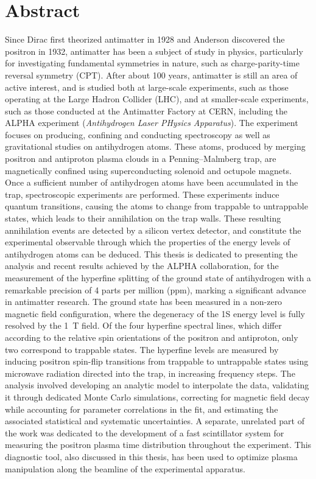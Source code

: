 
\chapter*{Abstract}


Since Dirac first theorized antimatter in 1928 and Anderson discovered the positron in 1932, antimatter has been a subject of study in physics, particularly for investigating fundamental symmetries in nature, such as charge-parity-time reversal symmetry (CPT). After about 100 years, antimatter is still an area of active interest, and is studied both at large-scale experiments, such as those operating at the Large Hadron Collider (LHC), and at smaller-scale experiments, such as those conducted at the Antimatter Factory at CERN, including the ALPHA experiment (\textit{Antihydrogen Laser PHysics Apparatus}). The experiment focuses on producing, confining and conducting spectroscopy as well as gravitational studies on antihydrogen atoms. These atoms, produced by merging positron and antiproton plasma clouds in a Penning--Malmberg trap, are magnetically confined using superconducting solenoid and octupole magnets. Once a sufficient number of antihydrogen atoms have been accumulated in the trap, spectroscopic experiments are performed. These experiments induce quantum transitions, causing the atoms to change from trappable to untrappable states, which leads to their annihilation on the trap walls. These resulting annihilation events are detected by a silicon vertex detector, and constitute the experimental observable through which the properties of the energy levels of antihydrogen atoms can be deduced. This thesis is dedicated to presenting the analysis and recent results achieved by the ALPHA collaboration, for the measurement of the hyperfine splitting of the ground state of antihydrogen with a remarkable precision of 4 parts per million (ppm), marking a significant advance in antimatter research. The ground state has been measured in a non-zero magnetic field configuration, where the degeneracy of the 1S energy level is fully resolved by the \SI{1}{\tesla} field. Of the four hyperfine spectral lines, which differ according to the relative spin orientations of the positron and antiproton, only two correspond to trappable states. The hyperfine levels are measured by inducing positron spin-flip transitions from trappable to untrappable states using microwave radiation directed into the trap, in increasing frequency steps. The analysis involved developing an analytic model to interpolate the data, validating it through dedicated Monte Carlo simulations, correcting for magnetic field decay while accounting for parameter correlations in the fit, and estimating the associated statistical and systematic uncertainties. A separate, unrelated part of the work was dedicated to the development of a fast scintillator system for measuring the positron plasma time distribution throughout the experiment. This diagnostic tool, also discussed in this thesis, has been used to optimize plasma manipulation along the beamline of the experimental apparatus.